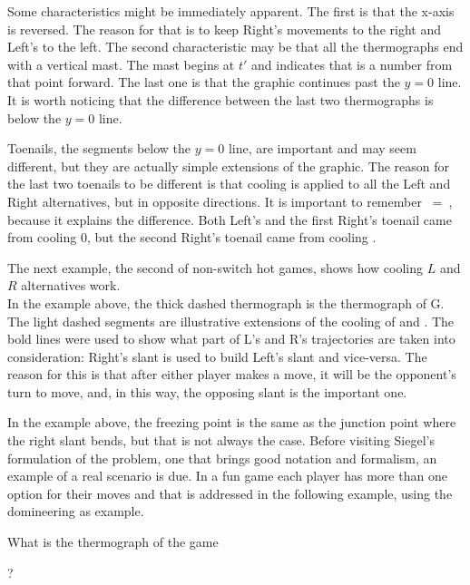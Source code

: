 Some characteristics might be immediately apparent. The first is that the x-axis is reversed. The reason for that is to keep Right's movements to the right and Left's to the left. The second characteristic may be that all the thermographs end with a vertical mast. The mast begins at $t'$ and indicates that \Gm{} is a number from that point forward. The last one is that the graphic continues past the $y=0$ line. It is worth noticing that the difference between the last two thermographs is below the $y=0$ line.

Toenails, the segments below the $y=0$ line, are important and may seem different, but they are actually simple extensions of the graphic. The reason for the last two toenails to be different is that cooling is applied to all the Left and Right alternatives, but in opposite directions. It is important to remember \hbox{ = }, because it explains the difference. Both Left's and the first Right's toenail came from cooling 0, but the second Right's toenail came from cooling .

The next example, the second of non-switch hot games, shows how cooling $L$ and $R$ alternatives work.\\



In the example above, the thick dashed thermograph is the thermograph of G. The light dashed segments are illustrative extensions of the cooling of  and . The bold lines were used to show what part of L's and R's trajectories are taken into consideration: Right's slant is used to build Left's slant and vice-versa. The reason for this is that after either player makes a move, it will be the opponent's turn to move, and, in this way, the opposing slant is the important one.

In the example above, the freezing point is the same as the junction point where the right slant bends, but that is not always the case. Before visiting Siegel's formulation of the problem, one that brings good notation and formalism, an example of a real scenario is due. In a fun game each player has more than one option for their moves and that is addressed in the following example, using the domineering as example. 

What is the thermograph of the game \Gm{=}
	 ? 

